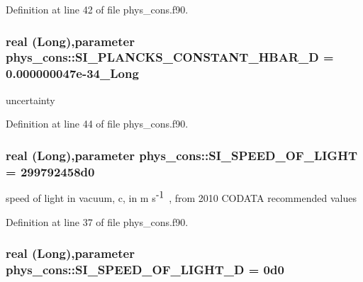 Definition at line 42 of file phys\_\-cons.f90.

\hypertarget{namespacephys__cons_af8ab82739d58ac3a1e1d9c97d3cfb4da}{
\subsubsection[{SI\_\-PLANCKS\_\-CONSTANT\_\-HBAR\_\-D}]{\setlength{\rightskip}{0pt plus 5cm}real (Long),parameter {\bf phys\_\-cons::SI\_\-PLANCKS\_\-CONSTANT\_\-HBAR\_\-D} = 0.000000047e-\/34\_\-Long}}
\label{namespacephys__cons_af8ab82739d58ac3a1e1d9c97d3cfb4da}


uncertainty 



Definition at line 44 of file phys\_\-cons.f90.

\hypertarget{namespacephys__cons_ae265fad966cfc841f9a073a52955d742}{
\subsubsection[{SI\_\-SPEED\_\-OF\_\-LIGHT}]{\setlength{\rightskip}{0pt plus 5cm}real (Long),parameter {\bf phys\_\-cons::SI\_\-SPEED\_\-OF\_\-LIGHT} = 299792458d0}}
\label{namespacephys__cons_ae265fad966cfc841f9a073a52955d742}


speed of light in vacuum, c, in m s$^{\mbox{-\/1}}$ , from 2010 CODATA recommended values 



Definition at line 37 of file phys\_\-cons.f90.

\hypertarget{namespacephys__cons_a5547546b06eb8853e52e304b25cc7596}{
\subsubsection[{SI\_\-SPEED\_\-OF\_\-LIGHT\_\-D}]{\setlength{\rightskip}{0pt plus 5cm}real (Long),parameter {\bf phys\_\-cons::SI\_\-SPEED\_\-OF\_\-LIGHT\_\-D} = 0d0}}
\label{namespacephys__cons_a5547546b06eb8853e52e304b25cc7596}


